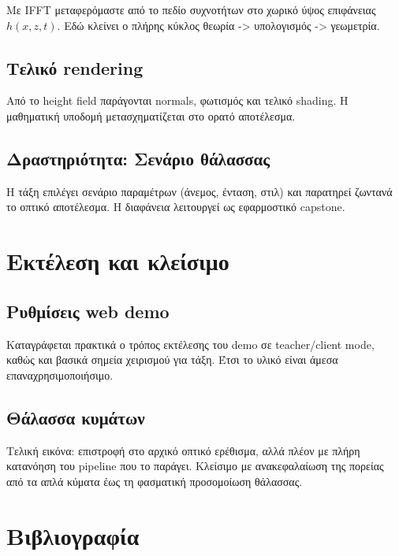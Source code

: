 \documentclass[a4paper, 11pt]{article}
\begin{document}
Με IFFT μεταφερόμαστε από το πεδίο συχνοτήτων στο χωρικό ύψος επιφάνειας
\(h(x,z,t)\). Εδώ κλείνει ο πλήρης κύκλος θεωρία -\textgreater{}
υπολογισμός -\textgreater{} γεωμετρία.

\subsection{Τελικό
rendering}\label{ux3c4ux3b5ux3bbux3b9ux3baux3cc-rendering}

Από το height field παράγονται normals, φωτισμός και τελικό shading. Η
μαθηματική υποδομή μετασχηματίζεται στο ορατό αποτέλεσμα.

\subsection{Δραστηριότητα: Σενάριο
θάλασσας}\label{ux3b4ux3c1ux3b1ux3c3ux3c4ux3b7ux3c1ux3b9ux3ccux3c4ux3b7ux3c4ux3b1-ux3c3ux3b5ux3bdux3acux3c1ux3b9ux3bf-ux3b8ux3acux3bbux3b1ux3c3ux3c3ux3b1ux3c2}

Η τάξη επιλέγει σενάριο παραμέτρων (άνεμος, ένταση, στιλ) και παρατηρεί
ζωντανά το οπτικό αποτέλεσμα. Η διαφάνεια λειτουργεί ως εφαρμοστικό
capstone.

\section{Εκτέλεση και
κλείσιμο}\label{ux3b5ux3baux3c4ux3adux3bbux3b5ux3c3ux3b7-ux3baux3b1ux3b9-ux3baux3bbux3b5ux3afux3c3ux3b9ux3bcux3bf}

\subsection{Ρυθμίσεις web
demo}\label{ux3c1ux3c5ux3b8ux3bcux3afux3c3ux3b5ux3b9ux3c2-web-demo}

Καταγράφεται πρακτικά ο τρόπος εκτέλεσης του demo σε teacher/client
mode, καθώς και βασικά σημεία χειρισμού για τάξη. Έτσι το υλικό είναι
άμεσα επαναχρησιμοποιήσιμο.

\subsection{Θάλασσα
κυμάτων}\label{ux3b8ux3acux3bbux3b1ux3c3ux3c3ux3b1-ux3baux3c5ux3bcux3acux3c4ux3c9ux3bd}

Τελική εικόνα: επιστροφή στο αρχικό οπτικό ερέθισμα, αλλά πλέον με πλήρη
κατανόηση του pipeline που το παράγει. Κλείσιμο με ανακεφαλαίωση της
πορείας από τα απλά κύματα έως τη φασματική προσομοίωση θάλασσας.

\section{Βιβλιογραφία}\label{ux3b2ux3b9ux3b2ux3bbux3b9ux3bfux3b3ux3c1ux3b1ux3c6ux3afux3b1}

\label{refs}
\end{document}
